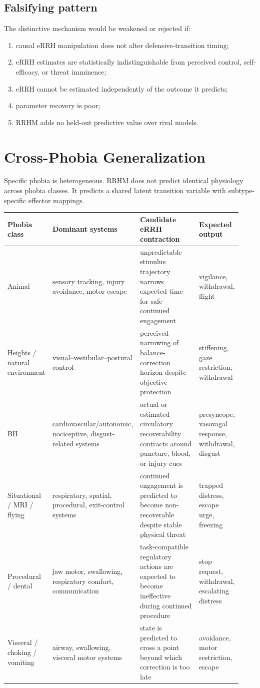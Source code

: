 \documentclass[11pt]{article}
\begin{document}
\subsection{Falsifying pattern}
The distinctive mechanism would be weakened or rejected if:
\begin{enumerate}[leftmargin=2em]
\item causal eRRH manipulation does not alter defensive-transition timing;
\item eRRH estimates are statistically indistinguishable from perceived control, self-efficacy, or threat imminence;
\item eRRH cannot be estimated independently of the outcome it predicts;
\item parameter recovery is poor;
\item RRHM adds no held-out predictive value over rival models.
\end{enumerate}

\section{Cross-Phobia Generalization}
Specific phobia is heterogeneous. RRHM does not predict identical physiology across phobia classes. It predicts a shared latent transition variable with subtype-specific effector mappings.

\begin{longtable}{p{0.17\linewidth}p{0.25\linewidth}p{0.34\linewidth}p{0.17\linewidth}}
\toprule
Phobia class & Dominant systems & Candidate eRRH contraction & Expected output \\
\midrule
Animal & sensory tracking, injury avoidance, motor escape & unpredictable stimulus trajectory narrows expected time for safe continued engagement & vigilance, withdrawal, flight \\
Heights / natural environment & visual--vestibular--postural control & perceived narrowing of balance-correction horizon despite objective protection & stiffening, gaze restriction, withdrawal \\
BII & cardiovascular/autonomic, nociceptive, disgust-related systems & actual or estimated circulatory recoverability contracts around puncture, blood, or injury cues & presyncope, vasovagal response, withdrawal, disgust \\
Situational / MRI / flying & respiratory, spatial, procedural, exit-control systems & continued engagement is predicted to become non-recoverable despite stable physical threat & trapped distress, escape urge, freezing \\
Procedural / dental & jaw motor, swallowing, respiratory comfort, communication & task-compatible regulatory actions are expected to become ineffective during continued procedure & stop request, withdrawal, escalating distress \\
Visceral / choking / vomiting & airway, swallowing, visceral motor systems & state is predicted to cross a point beyond which correction is too late & avoidance, motor restriction, escape \\
\bottomrule
\end{longtable}
\end{document}
